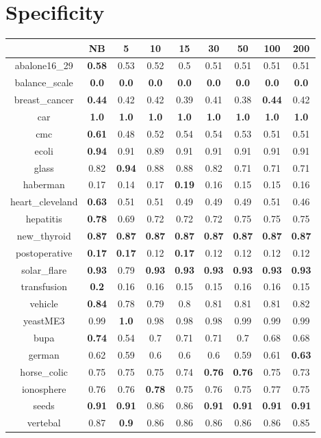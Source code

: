 \documentclass{article}%
\begin{document}
%
\section*{Specificity}%
\begin{tabular}{c|cccccccc}%
\hline%
&NB&5&10&15&30&50&100&200\\%
\hline%
abalone16\_29&\textbf{0.58}&0.53&0.52&0.5&0.51&0.51&0.51&0.51\\%
\hline%
balance\_scale&\textbf{0.0}&\textbf{0.0}&\textbf{0.0}&\textbf{0.0}&\textbf{0.0}&\textbf{0.0}&\textbf{0.0}&\textbf{0.0}\\%
\hline%
breast\_cancer&\textbf{0.44}&0.42&0.42&0.39&0.41&0.38&\textbf{0.44}&0.42\\%
\hline%
car&\textbf{1.0}&\textbf{1.0}&\textbf{1.0}&\textbf{1.0}&\textbf{1.0}&\textbf{1.0}&\textbf{1.0}&\textbf{1.0}\\%
\hline%
cmc&\textbf{0.61}&0.48&0.52&0.54&0.54&0.53&0.51&0.51\\%
\hline%
ecoli&\textbf{0.94}&0.91&0.89&0.91&0.91&0.91&0.91&0.91\\%
\hline%
glass&0.82&\textbf{0.94}&0.88&0.88&0.82&0.71&0.71&0.71\\%
\hline%
haberman&0.17&0.14&0.17&\textbf{0.19}&0.16&0.15&0.15&0.16\\%
\hline%
heart\_cleveland&\textbf{0.63}&0.51&0.51&0.49&0.49&0.49&0.51&0.46\\%
\hline%
hepatitis&\textbf{0.78}&0.69&0.72&0.72&0.72&0.75&0.75&0.75\\%
\hline%
new\_thyroid&\textbf{0.87}&\textbf{0.87}&\textbf{0.87}&\textbf{0.87}&\textbf{0.87}&\textbf{0.87}&\textbf{0.87}&\textbf{0.87}\\%
\hline%
postoperative&\textbf{0.17}&\textbf{0.17}&0.12&\textbf{0.17}&0.12&0.12&0.12&0.12\\%
\hline%
solar\_flare&\textbf{0.93}&0.79&\textbf{0.93}&\textbf{0.93}&\textbf{0.93}&\textbf{0.93}&\textbf{0.93}&\textbf{0.93}\\%
\hline%
transfusion&\textbf{0.2}&0.16&0.16&0.15&0.15&0.16&0.16&0.15\\%
\hline%
vehicle&\textbf{0.84}&0.78&0.79&0.8&0.81&0.81&0.81&0.82\\%
\hline%
yeastME3&0.99&\textbf{1.0}&0.98&0.98&0.98&0.99&0.99&0.99\\%
\hline%
bupa&\textbf{0.74}&0.54&0.7&0.71&0.71&0.7&0.68&0.68\\%
\hline%
german&0.62&0.59&0.6&0.6&0.6&0.59&0.61&\textbf{0.63}\\%
\hline%
horse\_colic&0.75&0.75&0.75&0.74&\textbf{0.76}&\textbf{0.76}&0.75&0.73\\%
\hline%
ionosphere&0.76&0.76&\textbf{0.78}&0.75&0.76&0.75&0.77&0.75\\%
\hline%
seeds&\textbf{0.91}&\textbf{0.91}&0.86&0.86&\textbf{0.91}&\textbf{0.91}&\textbf{0.91}&\textbf{0.91}\\%
\hline%
vertebal&0.87&\textbf{0.9}&0.86&0.86&0.86&0.86&0.86&0.85\\%
\hline%
\end{tabular}
\end{document}
